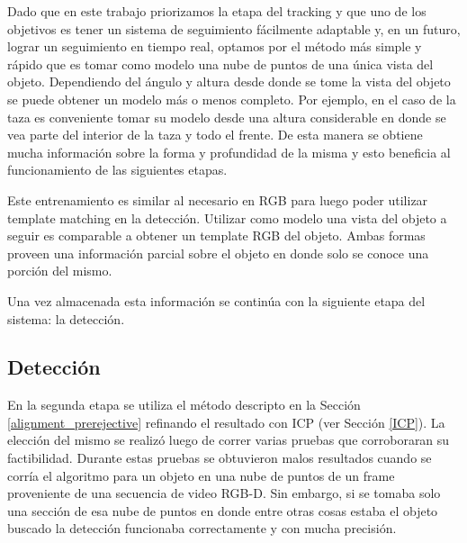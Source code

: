 Dado que en este trabajo priorizamos la etapa del tracking y que uno de los objetivos es tener un sistema de seguimiento fácilmente adaptable y, en un futuro, lograr un seguimiento en tiempo real, optamos por el método más simple y rápido que es tomar como modelo una nube de puntos de una única vista del objeto. Dependiendo del ángulo y altura desde donde se tome la vista del objeto se puede obtener un modelo más o menos completo. Por ejemplo, en el caso de la taza es conveniente tomar su modelo desde una altura considerable en donde se vea parte del interior de la taza y todo el frente. De esta manera se obtiene mucha información sobre la forma y profundidad de la misma y esto beneficia al funcionamiento de las siguientes etapas.

Este entrenamiento es similar al necesario en RGB para luego poder utilizar template matching en la detección. Utilizar como modelo una vista del objeto a seguir es comparable a obtener un template RGB del objeto. Ambas formas proveen una información parcial sobre el objeto en donde solo se conoce una porción del mismo.

Una vez almacenada esta información se continúa con la siguiente etapa del sistema: la detección.

\subsection{Detección}\label{deteccion_d}
En la segunda etapa se utiliza el método descripto en la Sección \ref{alignment_prerejective} refinando el resultado con ICP (ver Sección \ref{ICP}). La elección del mismo se realizó luego de correr varias pruebas que corroboraran su factibilidad. Durante estas pruebas se obtuvieron malos resultados cuando se corría el algoritmo para un objeto en una nube de puntos de un frame proveniente de una secuencia de video RGB-D. Sin embargo, si se tomaba solo una sección de esa nube de puntos en donde entre otras cosas estaba el objeto buscado la detección funcionaba correctamente y con mucha precisión.

